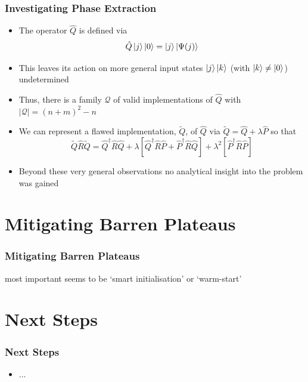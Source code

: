 \documentclass{beamer}
\begin{document}
\begin{frame}
\frametitle{Investigating Phase Extraction}
\begin{itemize}
\item The operator $\hat{Q}$ is defined via 
\begin{equation}
\hat{Q} \ket{j} \ket{0} = \ket{j} \ket{\Psi(j)}
\end{equation}
\item This leaves its action on more general input states $\ket{j}\ket{k}$ (with $\ket{k} \neq \ket{0}$) \alert{undetermined} 
\item Thus, there is a \alert{family} $\mathcal{Q}$ of valid implementations of $\hat{Q}$ with $|\mathcal{Q}|=(n+m)^2 -n$ 
\item We can represent a flawed implementation, $\tilde{Q}$, of $\hat{Q}$ via $\tilde{Q} = \hat{Q} + \lambda \hat{P}$ so that 
\begin{equation}
\tilde{Q}\hat{R} \tilde{Q} = \hat{Q}^\dagger \hat{R} \hat{Q} + \lambda \left[ \hat{Q}^\dagger  \hat{R} \hat{P} + \hat{P}^\dagger \hat{R} \hat{Q}\right] + \lambda^2 \left[ \hat{P}^\dagger \hat{R} \hat{P} \right]
\end{equation}
\item Beyond these very general observations \alert{no analytical insight into the problem was gained}
\end{itemize}
\end{frame}

\section{Mitigating Barren Plateaus}

\begin{frame}
\frametitle{Mitigating Barren Plateaus}
most important seems to be `smart initialisation' or `warm-start'

\end{frame}

\section{Next Steps}

\begin{frame}
\frametitle{Next Steps}
\begin{itemize}
\item ...
\end{itemize}
\end{frame}
\end{document}

